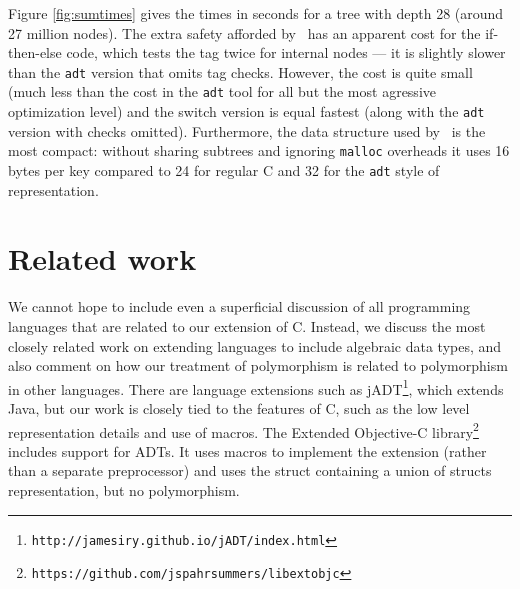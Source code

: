 Figure \ref{fig:sumtimes} gives the times in seconds for a tree with
depth 28 (around 27 million nodes).  The extra safety afforded by \adtpp\
has an apparent cost for the if-then-else code, which tests the tag twice
for internal nodes --- it is slightly slower than the \texttt{adt}
version that omits tag checks.  However, the cost is quite small
(much less than the cost in the \texttt{adt} tool for all but the most
agressive optimization level) and the switch version is equal fastest
(along with the \texttt{adt} version with checks omitted).  Furthermore,
the data structure used by \adtpp\ is the most compact: without sharing
subtrees and ignoring \texttt{malloc} overheads it uses 16 bytes per
key compared to 24 for regular C and 32
for the \texttt{adt} style of representation.

\section{Related work}
\label{sec-related}

We cannot hope to include even a superficial discussion of all
programming languages that are related to our extension of C.
Instead, we discuss the most closely related work on extending
languages to include algebraic data types, and also comment on how
our treatment of polymorphism is related to polymorphism in other
languages.  There are language extensions such as jADT\footnote{
\texttt{http://jamesiry.github.io/jADT/index.html}}, which extends Java,
but our work is closely tied to the features of C, such as the low level
representation details and use of macros.  The Extended Objective-C
library\footnote{ \texttt{https://github.com/jspahrsummers/libextobjc}}
includes support for ADTs.  It uses macros to implement the extension
(rather than a separate preprocessor) and uses the struct containing a
union of structs representation, but no polymorphism.

